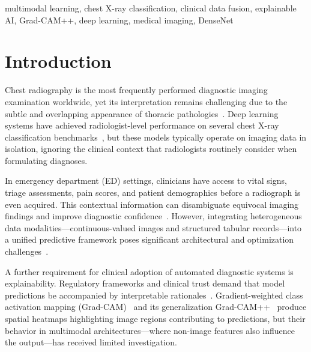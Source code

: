 \documentclass[conference]{IEEEtran}
\begin{document}
\begin{IEEEkeywords}
multimodal learning, chest X-ray classification, clinical data fusion, explainable AI, Grad-CAM++, deep learning, medical imaging, DenseNet
\end{IEEEkeywords}

\section{Introduction}\label{sec:intro}

Chest radiography is the most frequently performed diagnostic imaging examination worldwide, yet its interpretation remains challenging due to the subtle and overlapping appearance of thoracic pathologies~\cite{wang2017chestxray14}. Deep learning systems have achieved radiologist-level performance on several chest X-ray classification benchmarks~\cite{rajpurkar2017chexnet, irvin2019chexpert}, but these models typically operate on imaging data in isolation, ignoring the clinical context that radiologists routinely consider when formulating diagnoses.

In emergency department (ED) settings, clinicians have access to vital signs, triage assessments, pain scores, and patient demographics before a radiograph is even acquired. This contextual information can disambiguate equivocal imaging findings and improve diagnostic confidence~\cite{acosta2022multimodal}. However, integrating heterogeneous data modalities---continuous-valued images and structured tabular records---into a unified predictive framework poses significant architectural and optimization challenges~\cite{lipkova2022multimodal, kline2022multimodal}.

A further requirement for clinical adoption of automated diagnostic systems is explainability. Regulatory frameworks and clinical trust demand that model predictions be accompanied by interpretable rationales~\cite{holzinger2019xai}. Gradient-weighted class activation mapping (Grad-CAM)~\cite{selvaraju2017gradcam} and its generalization Grad-CAM++~\cite{chattopadhay2018gradcampp} produce spatial heatmaps highlighting image regions contributing to predictions, but their behavior in multimodal architectures---where non-image features also influence the output---has received limited investigation.
\end{document}
